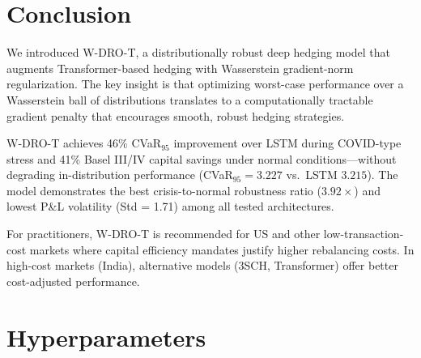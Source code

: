 \documentclass[11pt]{article}
\begin{document}
\section{Conclusion}
\label{sec:conclusion}

We introduced W-DRO-T, a distributionally robust deep hedging model that augments Transformer-based hedging with Wasserstein gradient-norm regularization. The key insight is that optimizing worst-case performance over a Wasserstein ball of distributions translates to a computationally tractable gradient penalty that encourages smooth, robust hedging strategies.

W-DRO-T achieves 46\% CVaR$_{95}$ improvement over LSTM during COVID-type stress and 41\% Basel III/IV capital savings under normal conditions---without degrading in-distribution performance (CVaR$_{95} = 3.227$ vs.\ LSTM $3.215$). The model demonstrates the best crisis-to-normal robustness ratio ($3.92\times$) and lowest P\&L volatility (Std = 1.71) among all tested architectures.

For practitioners, W-DRO-T is recommended for US and other low-transaction-cost markets where capital efficiency mandates justify higher rebalancing costs. In high-cost markets (India), alternative models (3SCH, Transformer) offer better cost-adjusted performance.




\appendix

\section{Hyperparameters}
\label{app:hyperparams}
\end{document}
